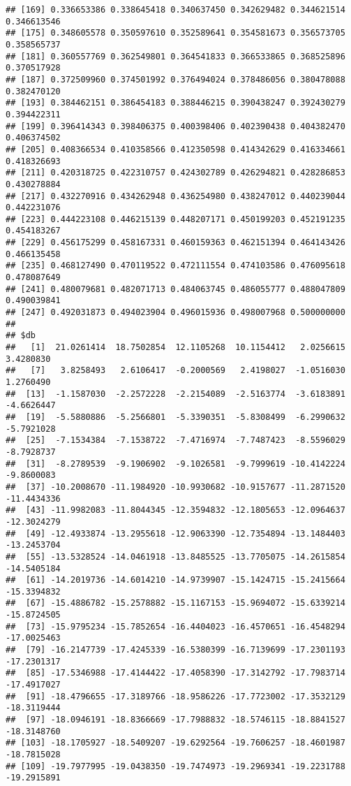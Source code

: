 \documentclass[
]{article}
\begin{document}
\begin{verbatim}
## [169] 0.336653386 0.338645418 0.340637450 0.342629482 0.344621514 0.346613546
## [175] 0.348605578 0.350597610 0.352589641 0.354581673 0.356573705 0.358565737
## [181] 0.360557769 0.362549801 0.364541833 0.366533865 0.368525896 0.370517928
## [187] 0.372509960 0.374501992 0.376494024 0.378486056 0.380478088 0.382470120
## [193] 0.384462151 0.386454183 0.388446215 0.390438247 0.392430279 0.394422311
## [199] 0.396414343 0.398406375 0.400398406 0.402390438 0.404382470 0.406374502
## [205] 0.408366534 0.410358566 0.412350598 0.414342629 0.416334661 0.418326693
## [211] 0.420318725 0.422310757 0.424302789 0.426294821 0.428286853 0.430278884
## [217] 0.432270916 0.434262948 0.436254980 0.438247012 0.440239044 0.442231076
## [223] 0.444223108 0.446215139 0.448207171 0.450199203 0.452191235 0.454183267
## [229] 0.456175299 0.458167331 0.460159363 0.462151394 0.464143426 0.466135458
## [235] 0.468127490 0.470119522 0.472111554 0.474103586 0.476095618 0.478087649
## [241] 0.480079681 0.482071713 0.484063745 0.486055777 0.488047809 0.490039841
## [247] 0.492031873 0.494023904 0.496015936 0.498007968 0.500000000
## 
## $db
##   [1]  21.0261414  18.7502854  12.1105268  10.1154412   2.0256615   3.4280830
##   [7]   3.8258493   2.6106417  -0.2000569   2.4198027  -1.0516030   1.2760490
##  [13]  -1.1587030  -2.2572228  -2.2154089  -2.5163774  -3.6183891  -4.6626447
##  [19]  -5.5880886  -5.2566801  -5.3390351  -5.8308499  -6.2990632  -5.7921028
##  [25]  -7.1534384  -7.1538722  -7.4716974  -7.7487423  -8.5596029  -8.7928737
##  [31]  -8.2789539  -9.1906902  -9.1026581  -9.7999619 -10.4142224  -9.8600083
##  [37] -10.2008670 -11.1984920 -10.9930682 -10.9157677 -11.2871520 -11.4434336
##  [43] -11.9982083 -11.8044345 -12.3594832 -12.1805653 -12.0964637 -12.3024279
##  [49] -12.4933874 -13.2955618 -12.9063390 -12.7354894 -13.1484403 -13.2453704
##  [55] -13.5328524 -14.0461918 -13.8485525 -13.7705075 -14.2615854 -14.5405184
##  [61] -14.2019736 -14.6014210 -14.9739907 -15.1424715 -15.2415664 -15.3394832
##  [67] -15.4886782 -15.2578882 -15.1167153 -15.9694072 -15.6339214 -15.8724505
##  [73] -15.9795234 -15.7852654 -16.4404023 -16.4570651 -16.4548294 -17.0025463
##  [79] -16.2147739 -17.4245339 -16.5380399 -16.7139699 -17.2301193 -17.2301317
##  [85] -17.5346988 -17.4144422 -17.4058390 -17.3142792 -17.7983714 -17.4917027
##  [91] -18.4796655 -17.3189766 -18.9586226 -17.7723002 -17.3532129 -18.3119444
##  [97] -18.0946191 -18.8366669 -17.7988832 -18.5746115 -18.8841527 -18.3148760
## [103] -18.1705927 -18.5409207 -19.6292564 -19.7606257 -18.4601987 -18.7815028
## [109] -19.7977995 -19.0438350 -19.7474973 -19.2969341 -19.2231788 -19.2915891

\end{verbatim}
\end{document}
